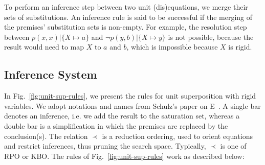 To perform an inference step between two unit (dis)equations, we merge their
sets of substitutions. An inference rule is said to be successful if the merging
of the premises' substitution sets is non-empty. For example, the resolution step
between $p(x,x)| \{ X \mapsto a \}$ and $\lnot p(y,b)| \{ X \mapsto y \}$ is not
possible, because the result would need to map $X$ to $a$ and $b$, which is
impossible because $X$ is rigid.

\subsection{Inference System}

In Fig.~\ref{fig:unit-sup-rules}, we present the rules for unit superposition
with rigid variables. We adopt notations and names from Schulz's paper on
E~\cite{SS02}. A single bar denotes an inference, i.e. we add the result to the
saturation set, whereas a double bar is a simplification in which the premises
are replaced by the conclusion(s). The relation $\prec$ is a reduction ordering,
used to orient equations and restrict inferences, thus pruning the search space.
Typically, $\prec$ is one of RPO or KBO. The rules of
Fig.~\ref{fig:unit-sup-rules} work as described below:

